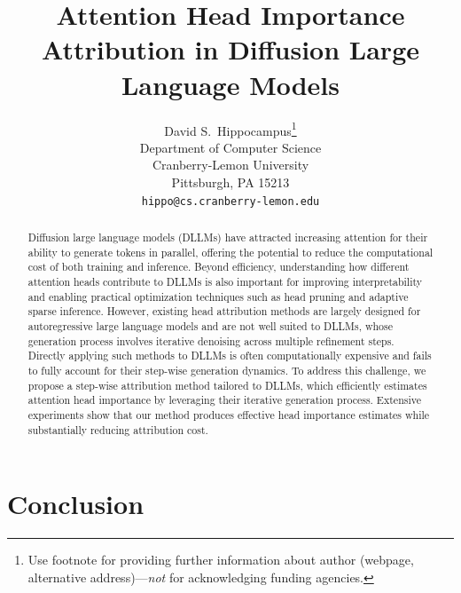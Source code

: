 \documentclass{article}
\title{Attention Head Importance Attribution in Diffusion Large Language Models}
\author{%
  David S.~Hippocampus\thanks{Use footnote for providing further information
    about author (webpage, alternative address)---\emph{not} for acknowledging
    funding agencies.} \\
  Department of Computer Science\\
  Cranberry-Lemon University\\
  Pittsburgh, PA 15213 \\
  \texttt{hippo@cs.cranberry-lemon.edu} \\
}
\theoremstyle{plain}
\theoremstyle{definition}
\theoremstyle{remark}
\begin{document}
\maketitle

\begin{abstract}
Diffusion large language models (DLLMs) have attracted increasing attention for their ability to generate tokens in parallel, offering the potential to reduce the computational cost of both training and inference. Beyond efficiency, understanding how different attention heads contribute to DLLMs is also important for improving interpretability and enabling practical optimization techniques such as head pruning and adaptive sparse inference. However, existing head attribution methods are largely designed for autoregressive large language models and are not well suited to DLLMs, whose generation process involves iterative denoising across multiple refinement steps. Directly applying such methods to DLLMs is often computationally expensive and fails to fully account for their step-wise generation dynamics. To address this challenge, we propose a step-wise attribution method tailored to DLLMs, which efficiently estimates attention head importance by leveraging their iterative generation process. Extensive experiments show that our method produces effective head importance estimates while substantially reducing attribution cost.
\end{abstract}









\section{Conclusion}




\nocite{langley00}

% 
% 

\newpage
\appendix
\onecolumn



\end{document}
